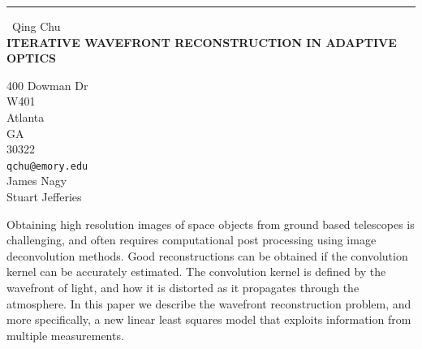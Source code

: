 \documentclass{report}
\begin{document}
\begin{center}
\rule{6in}{1pt} \
{\large Qing Chu \\
{\bf ITERATIVE WAVEFRONT RECONSTRUCTION IN ADAPTIVE OPTICS}}

400 Dowman Dr  \\ W401 \\ Atlanta \\ GA \\ 30322
\\
{\tt qchu@emory.edu}\\
James Nagy\\
Stuart Jefferies\end{center}

Obtaining high resolution images of space objects from
ground based telescopes is challenging, and often
requires computational post processing using image
deconvolution methods. Good reconstructions can be
obtained if the convolution kernel can be accurately
estimated. The convolution kernel is defined by the
wavefront of light, and how it is distorted as it propagates
through the atmosphere. In this paper we describe the wavefront
reconstruction problem, and more specifically, a new
linear least squares model that exploits information from
multiple measurements.
\end{document}
